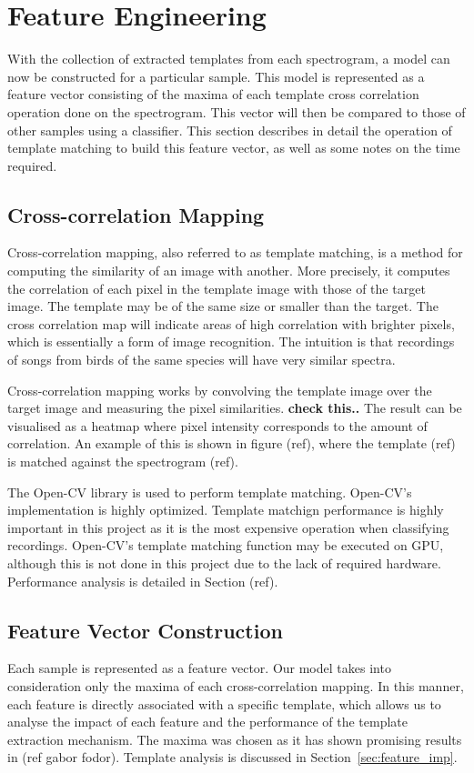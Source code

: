 \section{Feature Engineering}\label{sec:ccm}
With the collection of extracted templates from each spectrogram,
a model can now be constructed for a particular sample.
This model is represented as a feature vector consisting of the maxima
of each template cross correlation operation done on the spectrogram.
This vector will then be compared to those of other samples using a
classifier.
This section describes in detail the operation of template matching
to build this feature vector, as well as some notes on the time
required.

\subsection{Cross-correlation Mapping}
Cross-correlation mapping, also referred to as template matching, is
a method for computing the similarity of an image with another.
More precisely, it computes the correlation of each pixel in the template image
with those of the target image.
The template may be of the same size or smaller than the target.
The cross correlation map will indicate areas of high correlation with brighter
pixels, which is essentially a form of image recognition.
The intuition is that recordings of songs from birds of the same species will
have very similar spectra.

Cross-correlation mapping works by convolving the template image
over the target image and measuring the pixel similarities.
\textbf{check this..}
The result can be visualised as a heatmap where pixel intensity corresponds to
the amount of correlation.
An example of this is shown in figure (ref), where the template (ref) is matched
against the spectrogram (ref).

The Open-CV library is used to perform template matching.
Open-CV's implementation is highly optimized.
Template matchign performance is highly important in this project as it is the
most expensive operation when classifying recordings.
Open-CV's template matching function may be executed on GPU, although this is
not done in this project due to the lack of required hardware.
Performance analysis is detailed in Section (ref).

\subsection{Feature Vector Construction}
Each sample is represented as a feature vector.
Our model takes into consideration only the maxima of each cross-correlation
mapping.
In this manner, each feature is directly associated with a specific template,
which allows us to analyse the impact of each feature and the performance of the
template extraction mechanism.
The maxima was chosen as it has shown promising results in (ref gabor fodor).
Template analysis is discussed in Section~\ref{sec:feature_imp}.

